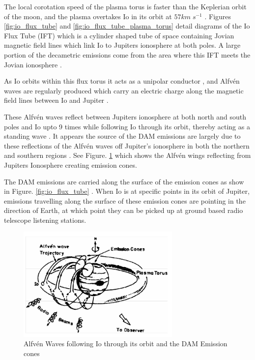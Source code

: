 \documentclass[runningheads,a4paper]{llncs}
\begin{document}
The local corotation speed of the plasma torus is faster than the Keplerian orbit of the moon, and the plasma overtakes Io in its orbit at \begin{math} 57 km\;s^{-1} \end{math} \citep{belcher87}. Figures \ref{fig:io_flux_tube} and \ref{fig:io_flux_tube_plasma_torus} detail diagrams of the Io Flux Tube (\gls{IFT}) which is a cylinder shaped tube of space containing Jovian magnetic field lines \citep{belcher87} which link Io to Jupiters ionosphere at both poles. A large portion of the decametric emissions come from the area where this \gls{IFT} meets the Jovian ionosphere \citep{belcher87}. 

As Io orbits within this flux torus it acts as a unipolar conductor \citep{bose08}, and Alfv\'en waves are regularly produced which carry an electric charge along the magnetic field lines between Io and Jupiter \citep{bose08}.

 These Alfv\'en waves reflect between Jupiters ionosphere at both north and south poles and Io upto 9 times \citep{bose08} while following Io through its orbit, thereby acting as a standing wave \citep{bose08}. It appears the source of the \gls{DAM} emissions are largely due to these reflections of the Alfv\'en waves off Jupiter's ionosphere in both the northern and southern regions \citep{bose08}. See Figure. \ref{fig:io_plasma_torus} which shows the Alfv\'en wings reflecting from Jupiters Ionosphere creating emission cones. 

The \gls{DAM} emissions are carried along the surface of the emission cones as show in Figure. \ref{fig:io_flux_tube} \citep{belcher87}. When Io is at specific points in its orbit of Jupiter, emissions travelling along the surface of these emission cones are pointing in the direction of Earth, at which point they can be picked up at ground based radio telescope listening stations.

%
\begin{figure}[here]
\centering
\includegraphics[width=8cm]{images/04}
\caption{Alfv\'en Waves following Io through its orbit and the DAM Emission cones \citep{bose08}}
\label{fig:io_plasma_torus}
\end{figure}
%
\end{document}
